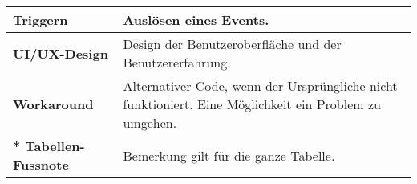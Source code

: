 \begin{table}[!ht]
\begin{adjustbox}{max width=\textwidth}
\begin{threeparttable}
\begin{tabular}{ p{\glossarywithTitle} | p{\glossarywith} }
                \hline
                \bf{Triggern} & Auslösen eines Events. \\
                \hline
                \bf{UI/UX-Design} & Design der Benutzeroberfläche und der Benutzererfahrung. \\
                \hline
                \bf{Workaround} & 
                    Alternativer Code, wenn der Ursprüngliche nicht funktioniert. 
                    Eine Möglichkeit ein Problem zu umgehen. \\
                \hline
                \hline
                \raggedright \bf{* Tabellen-Fussnote} & Bemerkung gilt für die ganze Tabelle. \\
                \hline
            \end{tabular}
        \end{threeparttable}
    \end{adjustbox}
\end{table}
